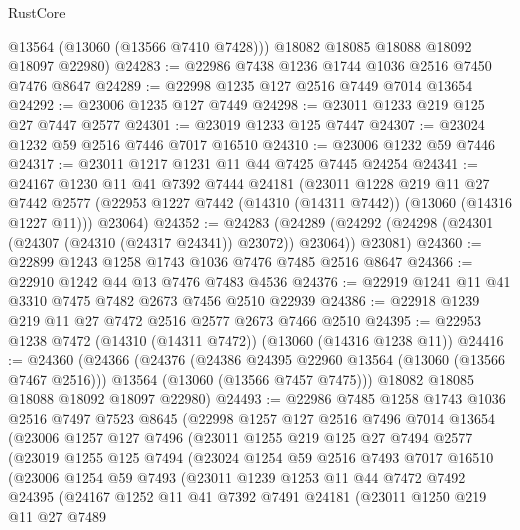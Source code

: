 \begin{lexlean}{RustCore}
\begin{coremodule}
        @13564
        (@13060 (@13566 @7410 @7428)))
      @18082
      @18085
      @18088
      @18092
      @18097
      @22980)
@24283 := @22986 @7438 @1236 @1744 @1036 @2516 @7450 @7476 @8647
@24289 := @22998 @1235 @127 @2516 @7449 @7014 @13654
@24292 := @23006 @1235 @127 @7449
@24298 := @23011 @1233 @219 @125 @27 @7447 @2577
@24301 := @23019 @1233 @125 @7447
@24307 := @23024 @1232 @59 @2516 @7446 @7017 @16510
@24310 := @23006 @1232 @59 @7446
@24317 := @23011 @1217 @1231 @11 @44 @7425 @7445 @24254
@24341 := @24167
    @1230
    @11
    @41
    @7392
    @7444
    @24181
    (@23011
      @1228
      @219
      @11
      @27
      @7442
      @2577
      (@22953 @1227 @7442 (@14310 (@14311 @7442)) (@13060 (@14316 @1227 @11)))
      @23064)
@24352 := @24283
    (@24289 (@24292 (@24298 (@24301 (@24307 (@24310 (@24317 @24341)) @23072)) @23064)) @23081)
@24360 := @22899 @1243 @1258 @1743 @1036 @7476 @7485 @2516 @8647
@24366 := @22910 @1242 @44 @13 @7476 @7483 @4536
@24376 := @22919 @1241 @11 @41 @3310 @7475 @7482 @2673 @7456 @2510 @22939
@24386 := @22918 @1239 @219 @11 @27 @7472 @2516 @2577 @2673 @7466 @2510
@24395 := @22953 @1238 @7472 (@14310 (@14311 @7472)) (@13060 (@14316 @1238 @11))
@24416 := @24360
    (@24366
      (@24376
        (@24386 @24395 @22960 @13564 (@13060 (@13566 @7467 @2516)))
        @13564
        (@13060 (@13566 @7457 @7475)))
      @18082
      @18085
      @18088
      @18092
      @18097
      @22980)
@24493 := @22986
    @7485
    @1258
    @1743
    @1036
    @2516
    @7497
    @7523
    @8645
    (@22998
      @1257
      @127
      @2516
      @7496
      @7014
      @13654
      (@23006
        @1257
        @127
        @7496
        (@23011
          @1255
          @219
          @125
          @27
          @7494
          @2577
          (@23019
            @1255
            @125
            @7494
            (@23024
              @1254
              @59
              @2516
              @7493
              @7017
              @16510
              (@23006
                @1254
                @59
                @7493
                (@23011
                  @1239
                  @1253
                  @11
                  @44
                  @7472
                  @7492
                  @24395
                  (@24167
                    @1252
                    @11
                    @41
                    @7392
                    @7491
                    @24181
                    (@23011
                      @1250
                      @219
                      @11
                      @27
                      @7489

\end{coremodule}
\end{lexlean}
